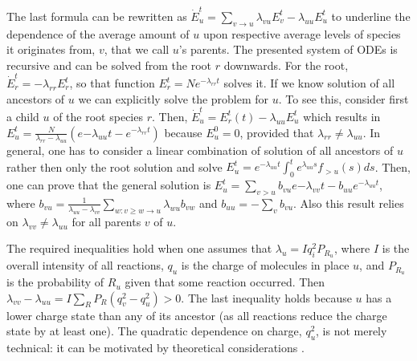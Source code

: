 \documentclass{llncs}
\begin{document}
The last formula can be rewritten as $ \dot E_u^t = \sum_{v\rightarrow u} \lambda_{vu} E_v^t - \lambda_{uu}E_u^t$ to underline the dependence of the average amount of $u$ upon respective average levels of species it originates from, $v$, that we call $u$'s parents.
The presented system of ODEs is recursive and can be solved from the root $r$ downwards.
For the root, $\dot E_r^t=-\lambda_{rr} E_r^t$, so that function $E_r^t= Ne^{-\lambda_{rr}t}$ solves it.
If we know solution of all ancestors of $u$ we can explicitly solve the problem for $u$. To see this, consider first a child $u$ of the root species $r$.
Then, $\dot E_u^t= E_r^t(t)-\lambda_{uu} E_u^t$ which results in $E_u^t= \frac{N}{\lambda_{rr}-\lambda_{uu}}(e{-\lambda_{uu}t}-e^{-\lambda_{rr}t})$ because
$E_u^0=0$, provided that $\lambda_{rr} \not= \lambda_{uu}$. In general, one has to consider a linear combination of solution of all ancestors of $u$ rather then only the root solution and solve $E_u^t=e^{-\lambda_{uu}t} \int_0^t e^{\lambda_{uu}s} f_{>u}(s)ds$.
Then, one can prove that the general solution is $E_u^t=\sum_{v>u}b_{vu}e{-\lambda_{vv}t}-b_{uu}e^{-\lambda_{uu}t}$, where $b_{vu}= \frac{1}{\lambda_{uu}-\lambda_{vv}} \sum_{w: v\geq w \rightarrow u} \lambda_{wu}b_{vw}$ and $b_{uu}=-\sum_v b_{vu}$.
Also this result relies on $\lambda_{vv} \not= \lambda_{uu}$ for all parents $v$ of $u$.
%

The required inequalities hold when one assumes that $\lambda_u = I q_i^2 P_{R_u}$, where $I$ is the overall intensity of all reactions, $q_u$ is the charge of molecules in place $u$, and $P_{R_u}$ is the probability of $R_u$ given that some reaction occurred. Then $\lambda_{vv} - \lambda_{uu} = I \sum_{R} P_R (q_v^2  - q_u^2) > 0.$
The last inequality holds because $u$ has a lower charge state than any of its ancestor
(as all reactions reduce the charge state by at least one).
The quadratic dependence on charge, $q_u^2$, is not merely technical: it can be motivated by theoretical considerations \cite{McLuckey1999-su}.
\end{document}
